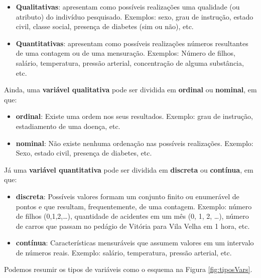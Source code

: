 \documentclass[
]{book}
\providecommand{\tightlist}{%
  \setlength{\itemsep}{0pt}\setlength{\parskip}{0pt}}
\begin{document}
\begin{itemize}
\item
  \textbf{Qualitativas}: apresentam como possíveis realizações uma qualidade (ou atributo) do indivíduo pesquisado. Exemplos: sexo, grau de instrução, estado civil, classe social, presença de diabetes (sim ou não), etc.
\item
  \textbf{Quantitativas}: apresentam como possíveis realizações números resultantes de uma contagem ou de uma mensuração. Exemplos: Número de filhos, salário, temperatura, pressão arterial, concentração de alguma substância, etc.
\end{itemize}

Ainda, uma \textbf{variável qualitativa} pode ser dividida em \textbf{ordinal} ou \textbf{nominal}, em que:

\begin{itemize}
\item
  \textbf{ordinal}: Existe uma ordem nos seus resultados.
  Exemplo: grau de instrução, estadiamento de uma doença, etc.
\item
  \textbf{nominal}: Não existe nenhuma ordenação nas possíveis realizações.
  Exemplo: Sexo, estado civil, presença de diabetes, etc.
\end{itemize}

Já uma \textbf{variável quantitativa} pode ser dividida em \textbf{discreta} ou \textbf{contínua}, em que:

\begin{itemize}
\tightlist
\item
  \textbf{discreta}: Possíveis valores formam um conjunto finito ou enumerável de pontos e que resultam, frequentemente, de uma contagem. Exemplo:
  número de filhos (0,1,2,\ldots), quantidade de acidentes em um mês (0, 1, 2, \ldots), número de carros que passam no pedágio de Vitória para Vila Velha em 1 hora, etc.
\item
  \textbf{contínua}: Características mensuráveis que assumem valores em um intervalo de números reais. Exemplo: salário, temperatura, pressão arterial, etc.
\end{itemize}

Podemos resumir os tipos de variáveis como o esquema na Figura \ref{fig:tiposVars}.
\end{document}
